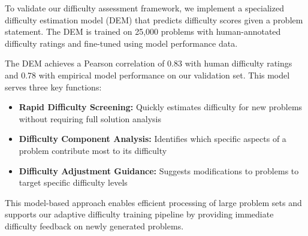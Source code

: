 To validate our difficulty assessment framework, we implement a specialized difficulty estimation model (DEM) that predicts difficulty scores given a problem statement. The DEM is trained on 25,000 problems with human-annotated difficulty ratings and fine-tuned using model performance data.

The DEM achieves a Pearson correlation of 0.83 with human difficulty ratings and 0.78 with empirical model performance on our validation set. This model serves three key functions:

\begin{itemize}
    \item \textbf{Rapid Difficulty Screening:} Quickly estimates difficulty for new problems without requiring full solution analysis
    \item \textbf{Difficulty Component Analysis:} Identifies which specific aspects of a problem contribute most to its difficulty
    \item \textbf{Difficulty Adjustment Guidance:} Suggests modifications to problems to target specific difficulty levels
\end{itemize}

This model-based approach enables efficient processing of large problem sets and supports our adaptive difficulty training pipeline by providing immediate difficulty feedback on newly generated problems.






